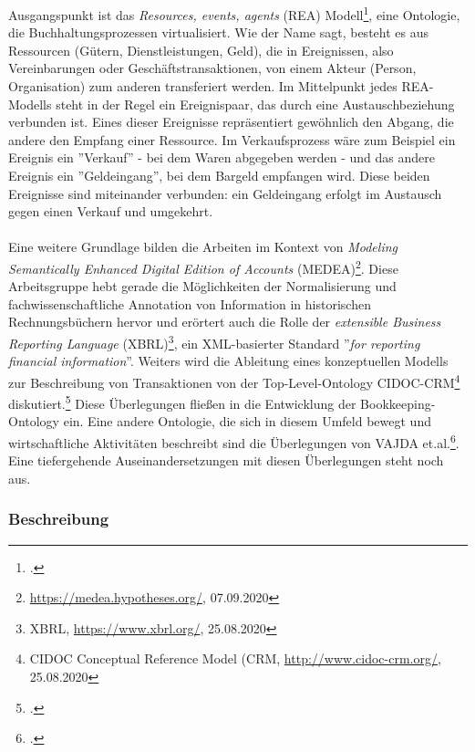 \documentclass[12pt,a4paper]{article}
\begin{document}
Ausgangspunkt ist das \textit{Resources, events, agents} (REA) Modell\footcite{mccarthy1982rea}, eine Ontologie, die Buchhaltungsprozessen virtualisiert. Wie der Name sagt, besteht es aus Ressourcen (Gütern, Dienstleistungen, Geld), die in Ereignissen, also Vereinbarungen oder Geschäftstransaktionen, von einem Akteur (Person, Organisation) zum anderen transferiert werden. Im Mittelpunkt jedes REA-Modells steht in der Regel ein Ereignispaar, das durch eine Austauschbeziehung verbunden ist. Eines dieser Ereignisse repräsentiert gewöhnlich den Abgang, die andere den Empfang einer Ressource. Im Verkaufsprozess wäre zum Beispiel ein Ereignis ein ''Verkauf'' - bei dem Waren abgegeben werden - und das andere Ereignis ein ''Geldeingang'', bei dem Bargeld empfangen wird. Diese beiden Ereignisse sind miteinander verbunden: ein Geldeingang erfolgt im Austausch gegen einen Verkauf und umgekehrt.
\\
\\
Eine weitere Grundlage bilden die Arbeiten im Kontext von \textit{Modeling Semantically Enhanced Digital Edition of Accounts} (MEDEA)\footnote{\url{https://medea.hypotheses.org/}, 07.09.2020}. Diese Arbeitsgruppe hebt gerade die Möglichkeiten der Normalisierung und fachwissenschaftliche Annotation von Information in historischen Rechnungsbüchern hervor und erörtert auch die Rolle der \textit{extensible Business Reporting Language} (XBRL)\footnote{XBRL, \url{https://www.xbrl.org/}, 25.08.2020}, ein XML-basierter Standard ''\textit{for reporting financial information}''. Weiters wird die Ableitung eines konzeptuellen Modells zur Beschreibung von Transaktionen von der Top-Level-Ontology CIDOC-CRM\footnote{CIDOC Conceptual Reference Model (CRM, \url{http://www.cidoc-crm.org/}, 25.08.2020} diskutiert.\footcite[][S.9-12]{tomasekmedea} Diese Überlegungen fließen in die Entwicklung der Bookkeeping-Ontology ein. Eine andere Ontologie, die sich in diesem Umfeld bewegt und wirtschaftliche Aktivitäten beschreibt sind die Überlegungen von VAJDA et.al.\footcite[][]{vajda2019toward}. Eine tiefergehende Auseinandersetzungen mit diesen Überlegungen steht noch aus.

\subsubsection{Beschreibung}
\end{document}
